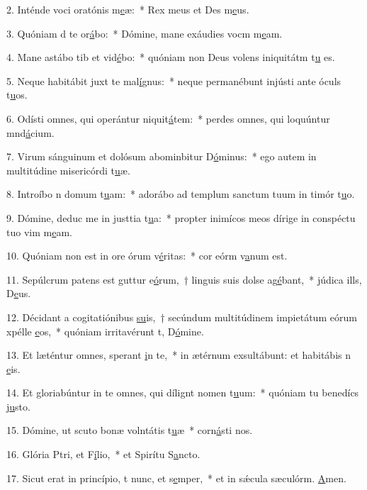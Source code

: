 2. Inténde voci oratónis m\uline{e}æ:~* Rex meus et Des m\uline{e}us.\par 
3. Quóniam d te or\uline{á}bo:~* Dómine, mane exáudies vocm m\uline{e}am.\par 
4. Mane astábo tib et vid\uline{é}bo:~* quóniam non Deus volens iniquitátm t\uline{u} es.\par 
5. Neque habitábit juxt te mal\uline{í}gnus:~* neque permanébunt injústi ante óculs t\uline{u}os.\par 
6. Odísti omnes, qui operántur niquit\uline{á}tem:~* perdes omnes, qui loquúntur mnd\uline{á}cium.\par 
7. Virum sánguinum et dolósum abominbitur D\uline{ó}minus:~* ego autem in multitúdine misericórdi t\uline{u}æ.\par 
8. Introíbo n domum t\uline{u}am:~* adorábo ad templum sanctum tuum in timór t\uline{u}o.\par 
9. Dómine, deduc me in justtia t\uline{u}a:~* propter inimícos meos dírige in conspéctu tuo vim m\uline{e}am.\par 
10. Quóniam non est in ore órum v\uline{é}ritas:~* cor eórm v\uline{a}num est.\par 
11. Sepúlcrum patens est guttur e\uline{ó}rum,~† linguis suis dolse ag\uline{é}bant,~* júdica ills, D\uline{e}us.\par 
12. Décidant a cogitatiónibus \uline{su}is,~† secúndum multitúdinem impietátum eórum xpélle \uline{e}os,~* quóniam irritavérunt t, D\uline{ó}mine.\par 
13. Et læténtur omnes,  sperant \uline{i}n te,~* in ætérnum exsultábunt: et habitábis n \uline{e}is.\par 
14. Et gloriabúntur in te omnes, qui dílignt nomen t\uline{u}um:~* quóniam tu benedícs j\uline{u}sto.\par 
15. Dómine, ut scuto bonæ volntátis t\uline{u}æ~* corn\uline{á}sti nos.\par 
16. Glória Ptri, et F\uline{í}lio,~* et Spirítu S\uline{a}ncto.\par 
17. Sicut erat in princípio, t nunc, et s\uline{e}mper,~* et in sǽcula sæculórm. \uline{A}men.\par 
